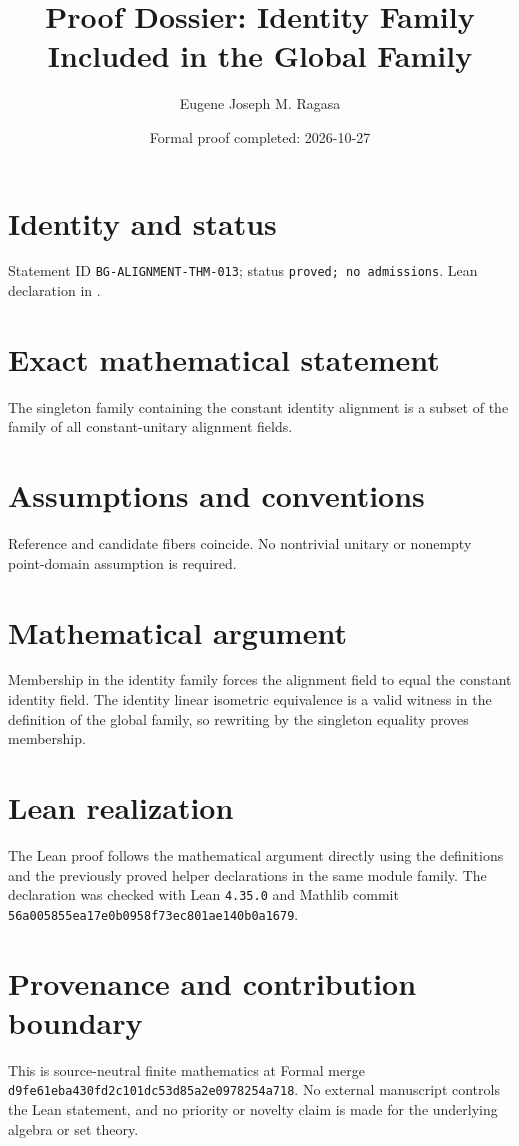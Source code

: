\documentclass[11pt]{article}
\title{Proof Dossier: Identity Family Included in the Global Family}
\author{Eugene Joseph M. Ragasa}
\date{Formal proof completed: 2026-10-27}
\begin{document}
\raggedright
\maketitle

\section{Identity and status}
Statement ID \texttt{BG-ALIGNMENT-THM-013}; status \texttt{proved; no admissions}.  Lean declaration
 in
.

\section{Exact mathematical statement}
The singleton family containing the constant identity alignment is a subset of the family of all constant-unitary alignment fields.

\section{Assumptions and conventions}
Reference and candidate fibers coincide.  No nontrivial unitary or nonempty point-domain assumption is required.

\section{Mathematical argument}
Membership in the identity family forces the alignment field to equal the constant identity field.  The identity linear isometric equivalence is a valid witness in the definition of the global family, so rewriting by the singleton equality proves membership.

\section{Lean realization}
The Lean proof follows the mathematical argument directly using the definitions and the
previously proved helper declarations in the same module family.  The declaration was checked
with Lean \texttt{4.35.0} and Mathlib commit \texttt{56a005855ea17e0b0958f73ec801ae140b0a1679}.

\section{Provenance and contribution boundary}
This is source-neutral finite mathematics at Formal merge
\texttt{d9fe61eba430fd2c101dc53d85a2e0978254a718}.  No external manuscript controls the Lean statement, and no priority or
novelty claim is made for the underlying algebra or set theory.
\end{document}
